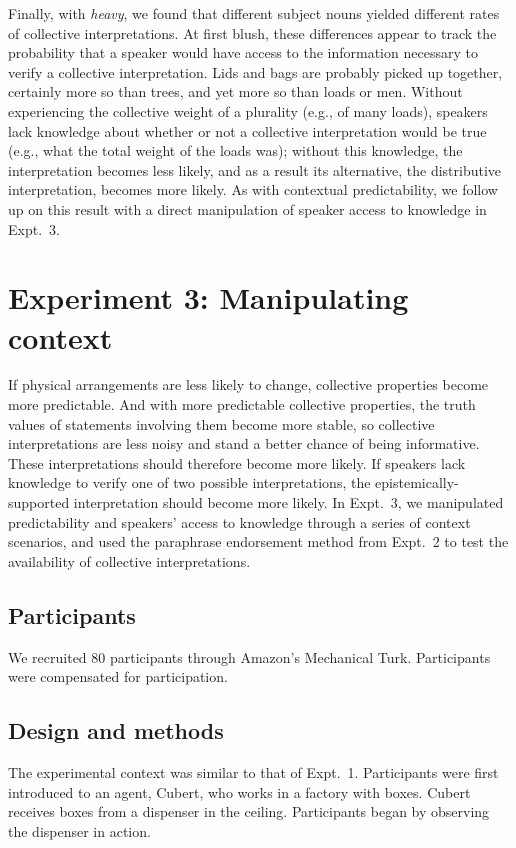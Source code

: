 \documentclass[linguex]{sp}
\begin{document}
Finally, with \emph{heavy}, we found that different subject nouns yielded different rates of collective interpretations. At first blush, these differences appear to track the probability that a speaker would have access to the information necessary to verify a collective interpretation. Lids and bags are probably picked up together, certainly more so than trees, and yet more so than loads or men. Without experiencing the collective weight of a plurality (e.g., of many loads), speakers lack knowledge about whether or not a collective interpretation would be true (e.g., what the total weight of the loads was); without this knowledge, the interpretation becomes less likely, and as a result its alternative, the distributive interpretation, becomes more likely. As with contextual predictability, we follow up on this result with a direct manipulation of speaker access to knowledge in Expt.~3.


\section{Experiment 3: Manipulating context}

If physical arrangements are less likely to change, collective properties become more predictable. And with more predictable collective properties, the truth values of statements involving them become more stable, so collective interpretations are less noisy and stand a better chance of being informative. These interpretations should therefore become more likely. If speakers lack knowledge to verify one of two possible interpretations, the epistemically-supported interpretation should become more likely. In Expt.~3, we manipulated predictability and speakers' access to knowledge through a series of context scenarios, and used the paraphrase endorsement method from Expt.~2 to test the availability of collective interpretations.

\subsection{Participants}

We recruited 80 participants through Amazon's Mechanical Turk. Participants were compensated for participation.

\subsection{Design and methods}

The experimental context was similar to that of Expt.~1. Participants were first introduced to an agent, Cubert, who works in a factory with boxes. Cubert receives boxes from a dispenser in the ceiling. Participants began by observing the dispenser in action.
\end{document}
